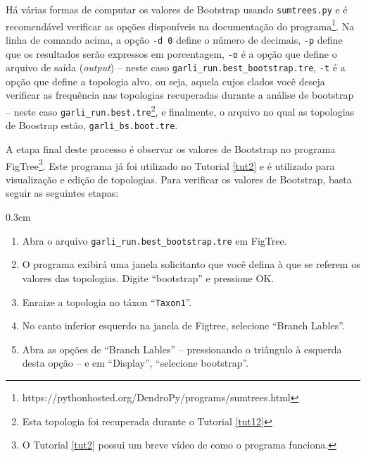 \begin{refsection}
\normalsize


Há várias formas de computar os valores de Bootstrap usando \texttt{sumtrees.py} e é recomendável verificar as opções disponíveis na documentação do programa\footnote{https://pythonhosted.org/DendroPy/programs/sumtrees.html}. Na linha de comando acima, a opção \texttt{-d 0} define o número de decimais, \texttt{-p} define que os resultados serão expressos em porcentagem, \texttt{-o} é a opção que define o arquivo de saída (\textit{output}) -- neste caso  \texttt{garli\_run.best\_bootstrap.tre}, \texttt{-t} é a opção que define a topologia alvo, ou seja, aquela cujos clados você deseja verificar as frequência nas topologias recuperadas durante a análise de bootstrap -- neste caso \texttt{garli\_run.best.tre}\footnote{Esta topologia foi recuperada durante o Tutorial \ref{tut12}}, e finalmente, o arquivo no qual as topologias de Boostrap estão, \texttt{garli\_bs.boot.tre}.

A etapa final deste processo é observar os valores de Bootstrap no programa FigTree\footnote{ O Tutorial \ref{tut2} possui um breve vídeo de como o programa funciona.}. Este programa já foi utilizado no Tutorial \ref{tut2} e é utilizado para visualização e edição de topologias. Para verificar os valores de Bootstrap, basta seguir as seguintes etapas:

\begin {myindentpar}{0.3cm}
\begin{enumerate}[1.]

	\item{Abra o arquivo \texttt{garli\_run.best\_bootstrap.tre} em FigTree.}
	\item{O programa exibirá uma janela solicitanto que você defina à que se referem os valores das topologias. Digite ``bootstrap'' e pressione OK.}
	\item{Enraize a topologia no táxon ``\texttt{Taxon1}''.}
	\item{No canto inferior esquerdo na janela de Figtree, selecione ``Branch Lables''.}
	\item{Abra as opções de ``Branch Lables'' -- pressionando o triângulo à esquerda desta opção -- e em ``Display'', ``selecione bootstrap''.}

\end{enumerate}
\end{myindentpar}



\end{refsection}
